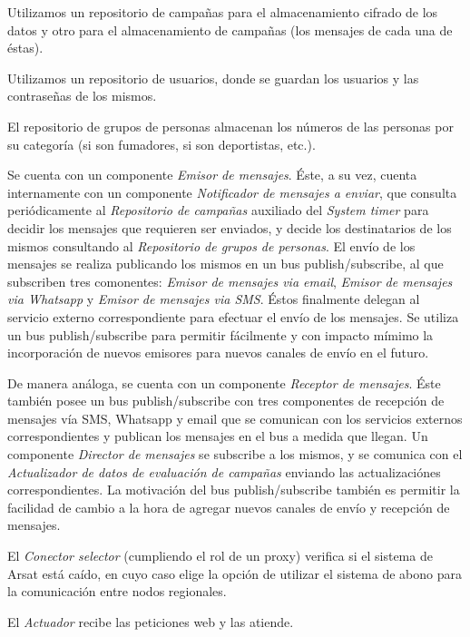 \documentclass[a4paper, 10pt, twoside]{article}
\begin{document}
Utilizamos un repositorio de campañas para el almacenamiento cifrado de los datos y otro para el almacenamiento de campañas (los mensajes de cada una de éstas).

Utilizamos un repositorio de usuarios, donde se guardan los usuarios y las contraseñas de los mismos.

El repositorio de grupos de personas almacenan los números de las personas por su categoría (si son fumadores, si son deportistas, etc.).

Se cuenta con un componente \textit{Emisor de mensajes}. Éste, a su vez, cuenta internamente con un componente \textit{Notificador de mensajes a enviar}, que consulta periódicamente al \textit{Repositorio de campañas} auxiliado del \textit{System timer} para decidir los mensajes que requieren ser enviados, y decide los destinatarios de los mismos consultando al \textit{Repositorio de grupos de personas}. El envío de los mensajes se realiza publicando los mismos en un bus publish/subscribe, al que subscriben tres comonentes: \textit{Emisor de mensajes via email}, \textit{Emisor de mensajes via Whatsapp} y \textit{Emisor de mensajes via SMS}. Éstos finalmente delegan al servicio externo correspondiente para efectuar el envío de los mensajes. Se utiliza un bus publish/subscribe para permitir fácilmente y con impacto mímimo la incorporación de nuevos emisores para nuevos canales de envío en el futuro.

De manera análoga, se cuenta con un componente \textit{Receptor de mensajes}. Éste también posee un bus publish/subscribe con tres componentes de recepción de mensajes vía SMS, Whatsapp y email que se comunican con los servicios externos correspondientes y publican los mensajes en el bus a medida que llegan. Un componente \textit{Director de mensajes} se subscribe a los mismos, y se comunica con el \textit{Actualizador de datos de evaluación de campañas} enviando las actualizaciónes correspondientes. La motivación del bus publish/subscribe también es permitir la facilidad de cambio a la hora de agregar nuevos canales de envío y recepción de mensajes.

El \textit{Conector selector} (cumpliendo el rol de un proxy) verifica si el sistema de Arsat está caído, en cuyo caso elige la opción de utilizar el sistema de abono para la comunicación entre nodos regionales.

El \textit{Actuador} recibe las peticiones web y las atiende.

\newpage


\end{document}
